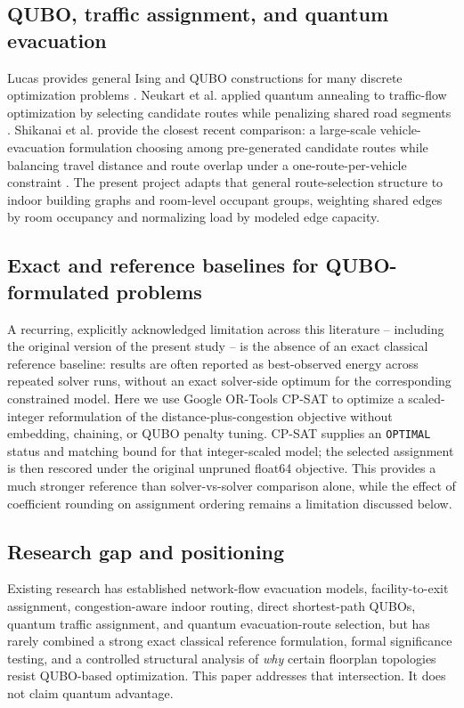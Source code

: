 \documentclass[11pt]{article}
\begin{document}
\subsection{QUBO, traffic assignment, and quantum evacuation}
Lucas provides general Ising and QUBO constructions for many discrete optimization problems \cite{lucas}. Neukart et al. applied quantum annealing to traffic-flow optimization by selecting candidate routes while penalizing shared road segments \cite{neukart}. Shikanai et al. provide the closest recent comparison: a large-scale vehicle-evacuation formulation choosing among pre-generated candidate routes while balancing travel distance and route overlap under a one-route-per-vehicle constraint \cite{shikanai}. The present project adapts that general route-selection structure to indoor building graphs and room-level occupant groups, weighting shared edges by room occupancy and normalizing load by modeled edge capacity.

\subsection{Exact and reference baselines for QUBO-formulated problems}
A recurring, explicitly acknowledged limitation across this literature -- including the original version of the present study -- is the absence of an exact classical reference baseline: results are often reported as best-observed energy across repeated solver runs, without an exact solver-side optimum for the corresponding constrained model. Here we use Google OR-Tools CP-SAT \cite{ortools} to optimize a scaled-integer reformulation of the distance-plus-congestion objective without embedding, chaining, or QUBO penalty tuning. CP-SAT supplies an \texttt{OPTIMAL} status and matching bound for that integer-scaled model; the selected assignment is then rescored under the original unpruned float64 objective. This provides a much stronger reference than solver-vs-solver comparison alone, while the effect of coefficient rounding on assignment ordering remains a limitation discussed below.

\subsection{Research gap and positioning}
Existing research has established network-flow evacuation models, facility-to-exit assignment, congestion-aware indoor routing, direct shortest-path QUBOs, quantum traffic assignment, and quantum evacuation-route selection, but has rarely combined a strong exact classical reference formulation, formal significance testing, and a controlled structural analysis of \emph{why} certain floorplan topologies resist QUBO-based optimization. This paper addresses that intersection. It does not claim quantum advantage.
\end{document}
